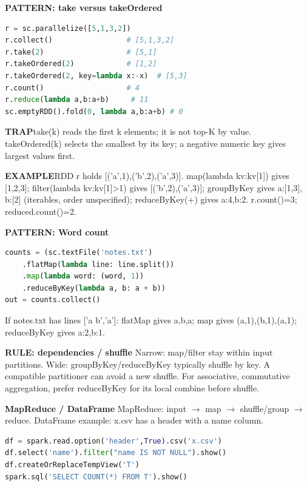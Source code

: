 \documentclass[a4paper]{article}
\newcommand{\bodyfontsize}{5.55}
\newcommand{\bodyleading}{5.3}
\newcommand{\bodylineskiplimit}{-2pt}
\newcommand{\bodystyle}{%
  \fontsize{\bodyfontsize}{\bodyleading}\selectfont\setlength{\lineskiplimit}{\bodylineskiplimit}\RaggedRight
  \setlength{\abovedisplayskip}{.5pt}\setlength{\belowdisplayskip}{.5pt}%
  \setlength{\abovedisplayshortskip}{.3pt}\setlength{\belowdisplayshortskip}{.3pt}}
\newenvironment{topicblock}
  {\par\bodystyle}
  {\par}
\newcommand{\key}[1]{\par\textcolor{structure}{\textbf{#1}}\enspace}
\newcommand{\note}[4]{\par\nointerlineskip\vspace{.25pt}\begingroup\setlength{\fboxsep}{0.1pt}%
  \noindent\colorbox{#1}{\parbox{\dimexpr\linewidth-2\fboxsep\relax}{%
    \RaggedRight\textcolor{#2}{\textbf{#3}}\enspace #4}}%
  \endgroup\par\nointerlineskip\vspace{.25pt}}
\newcommand{\trap}[1]{\note{warningbg}{warning}{TRAP}{#1}}
\newcommand{\ex}[1]{\note{examplebg}{example}{EXAMPLE}{#1}}
\newcommand{\pattern}[1]{\key{PATTERN: #1}}
\newlength{\sheetwidth}
\newenvironment{sheetcolumns}[1]
  {\noindent\begin{minipage}[t]{#1\sheetwidth}\vspace{0pt}\bodystyle\ignorespaces}
  {\end{minipage}\par}
\begin{document}
\begin{sheetcolumns}{.267}
\begin{topicblock}
\pattern{take versus takeOrdered}
\begin{lstlisting}[style=Plaincode,language=Python]
r = sc.parallelize([5,1,3,2])
r.collect()                 # [5,1,3,2]
r.take(2)                   # [5,1]
r.takeOrdered(2)            # [1,2]
r.takeOrdered(2, key=lambda x:-x)  # [5,3]
r.count()                   # 4
r.reduce(lambda a,b:a+b)     # 11
sc.emptyRDD().fold(0, lambda a,b:a+b) # 0
\end{lstlisting}
\trap{take(k) reads the first k elements; it is not top-K by value. takeOrdered(k) selects the smallest by its key; a negative numeric key gives largest values first.}
\ex{RDD r holds [('a',1),('b',2),('a',3)]. map(lambda kv:kv[1]) gives [1,2,3]; filter(lambda kv:kv[1]>1) gives [('b',2),('a',3)]; groupByKey gives a:[1,3], b:[2] (iterables, order unspecified); reduceByKey(+) gives a:4,b:2. r.count()=3; reduced.count()=2.}
\pattern{Word count}
\begin{lstlisting}[style=Plaincode,language=Python]
counts = (sc.textFile('notes.txt')
    .flatMap(lambda line: line.split())
    .map(lambda word: (word, 1))
    .reduceByKey(lambda a, b: a + b))
out = counts.collect()
\end{lstlisting}
If notes.txt has lines ['a b','a']: flatMap gives a,b,a; map gives (a,1),(b,1),(a,1); reduceByKey gives a:2,b:1.
\key{RULE: dependencies / shuffle}
Narrow: map/filter stay within input partitions. Wide: groupByKey/reduceByKey typically shuffle by key. A compatible partitioner can avoid a new shuffle. For associative, commutative aggregation, prefer reduceByKey for its local combine before shuffle.
\key{MapReduce / DataFrame}
MapReduce: input $\to$ map $\to$ shuffle/group $\to$ reduce. DataFrame example: x.csv has a header with a name column.
\begin{lstlisting}[style=Plaincode,language=Python]
df = spark.read.option('header',True).csv('x.csv')
df.select('name').filter("name IS NOT NULL").show()
df.createOrReplaceTempView('T')
spark.sql('SELECT COUNT(*) FROM T').show()
\end{lstlisting}
\end{topicblock}
\end{sheetcolumns}
\end{document}
